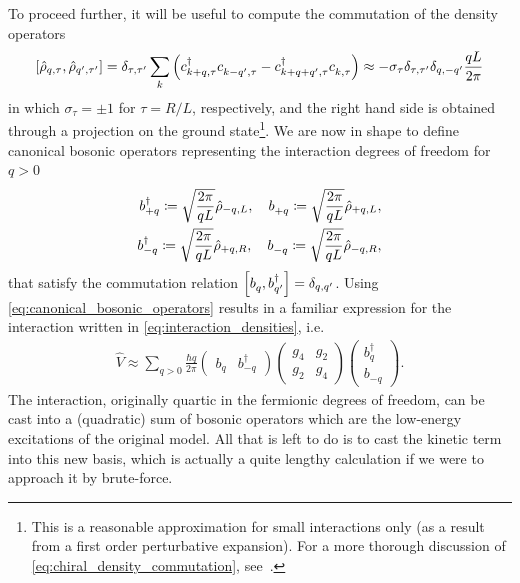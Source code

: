 To proceed further, it will be useful to compute the commutation of the density operators
\begin{align}
    \commutator{\hat\rho_{q,\tau},\hat\rho_{q',\tau'}}
    =
    \delta_{\tau,\tau'}\sum_k\brlr{c^\dag_{k+q,\tau}c^\pdag_{k-q',\tau}-c^\dag_{k+q+q',\tau}c^\pdag_{k,\tau}}
    \approx
    -\sigma_\tau\delta_{\tau,\tau'}\delta_{q,-q'}\frac{qL}{2\pi}
    \label{eq:chiral_density_commutation}
\end{align}
in which $\sigma_\tau=\pm1$ for $\tau=R/L$, respectively, and the right hand side is obtained through a projection on the ground state\footnote{This is a reasonable approximation for small interactions only (as a result from a first order perturbative expansion).
For a more thorough discussion of \cref{eq:chiral_density_commutation}, see~\cite{Giamarchi2003}.}.
We are now in shape to define canonical bosonic operators representing the interaction degrees of freedom for $q>0$
\begin{align}
    b^\dag_{+q} \coloneqq \sqrt\frac{2\pi}{qL}\hat\rho_{-q,L},
    \quad
    b^\pdag_{+q} \coloneqq \sqrt\frac{2\pi}{qL}\hat\rho_{+q,L},
    \\
    b^\dag_{-q} \coloneqq \sqrt\frac{2\pi}{qL}\hat\rho_{+q,R},
    \quad
    b^\pdag_{-q} \coloneqq \sqrt\frac{2\pi}{qL}\hat\rho_{-q,R},
    \label{eq:canonical_bosonic_operators}
\end{align}
that satisfy the commutation relation $\commutator{b_q^\pdag,b_{q'}^\dag} = \delta_{q,q'}$.
Using \cref{eq:canonical_bosonic_operators} results in a familiar expression for the interaction written in \cref{eq:interaction_densities}, i.e.
\begin{align}
    \hat V \approx\sum_{q>0}\frac{\hbar q}{2\pi}
    \begin{pmatrix}
        b_q & b^\dag_{-q}
    \end{pmatrix}
    \begin{pmatrix}
        g_4 & g_2 \\
        g_2 & g_4
    \end{pmatrix}
    \begin{pmatrix}
        b^\dag_q \\ b_{-q}
    \end{pmatrix}
    .
    \label{eq:quadratic_interactions}
\end{align}
The interaction, originally quartic in the fermionic degrees of freedom, can be cast into a (quadratic) sum of bosonic operators which are the low-energy excitations of the original model.
All that is left to do is to cast the kinetic term into this new basis, which is actually a quite lengthy calculation if we were to approach it by brute-force.
